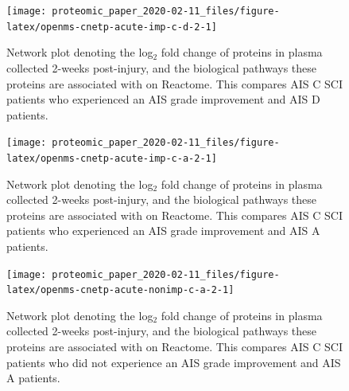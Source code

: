 \documentclass[9pt,lineno]{elife}
\newcommand{\blandscape}{\begin{landscape}}
\newcommand{\elandscape}{\end{landscape}}
\begin{document}
\begin{landscape}
\begin{landscape}
\begin{landscape}
\begin{landscape}
\begin{figure}

{\centering \texttt{[image: proteomic\_paper\_2020-02-11\_files/figure-latex/openms-cnetp-acute-imp-c-d-2-1]} 

}

\caption[Network plot - iTRAQ - Acute C Improvers VS Acute D]{Network plot denoting the log\(_2\) fold change of proteins in plasma collected 2-weeks post-injury, and the biological pathways these proteins are associated with on Reactome. This compares AIS C SCI patients who experienced an AIS grade improvement and AIS D patients.}\label{fig:openms-cnetp-acute-imp-c-d-2}
\end{figure}

\elandscape
\blandscape



\begin{figure}

{\centering \texttt{[image: proteomic\_paper\_2020-02-11\_files/figure-latex/openms-cnetp-acute-imp-c-a-2-1]} 

}

\caption[Network plot - iTRAQ - Acute C Improvers VS Acute A]{Network plot denoting the log\(_2\) fold change of proteins in plasma collected 2-weeks post-injury, and the biological pathways these proteins are associated with on Reactome. This compares AIS C SCI patients who experienced an AIS grade improvement and AIS A patients.}\label{fig:openms-cnetp-acute-imp-c-a-2}
\end{figure}

\elandscape
\blandscape



\begin{figure}

{\centering \texttt{[image: proteomic\_paper\_2020-02-11\_files/figure-latex/openms-cnetp-acute-nonimp-c-a-2-1]} 

}

\caption[Network plot - iTRAQ - Acute C Non-Improvers VS Acute A]{Network plot denoting the log\(_2\) fold change of proteins in plasma collected 2-weeks post-injury, and the biological pathways these proteins are associated with on Reactome. This compares AIS C SCI patients who did not experience an AIS grade improvement and AIS A patients.}\label{fig:openms-cnetp-acute-nonimp-c-a-2}
\end{figure}

\elandscape
\blandscape




\end{landscape}
\end{landscape}
\end{landscape}
\end{landscape}
\end{document}
